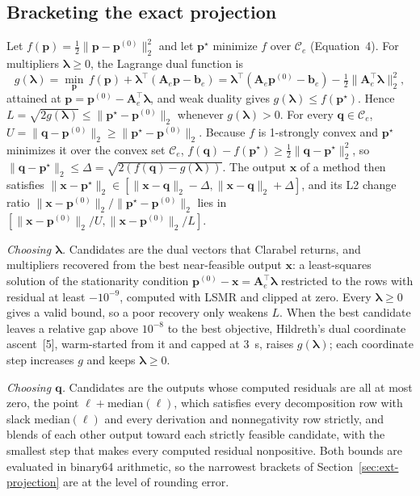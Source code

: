 \documentclass[10pt]{article}
\newcommand{\pvec}{\mathbf{p}}
\newcommand{\qvec}{\mathbf{q}}
\newcommand{\xvec}{\mathbf{x}}
\newcommand{\Amat}{\mathbf{A}}
\newcommand{\bvec}{\mathbf{b}}
\newcommand{\lam}{\boldsymbol{\lambda}}
\begin{document}
\subsection{Bracketing the exact projection}
\label{sec:bracket}
Let $f(\pvec) = \frac{1}{2}\lVert\pvec - \pvec^{(0)}\rVert_2^2$ and let $\pvec^{\star}$ minimize $f$ over $\mathcal{C}_e$ (Equation~4). For multipliers $\lam \ge 0$, the Lagrange dual function is
\begin{equation*}
g(\lam) = \min_{\pvec}\, f(\pvec) + \lam^{\top}(\Amat_e\pvec - \bvec_e) = \lam^{\top}(\Amat_e\pvec^{(0)} - \bvec_e) - \tfrac{1}{2}\lVert\Amat_e^{\top}\lam\rVert_2^2 ,
\end{equation*}
attained at $\pvec = \pvec^{(0)} - \Amat_e^{\top}\lam$, and weak duality gives $g(\lam) \le f(\pvec^{\star})$. Hence $L = \sqrt{2 g(\lam)} \le \lVert\pvec^{\star} - \pvec^{(0)}\rVert_2$ whenever $g(\lam) > 0$. For every $\qvec \in \mathcal{C}_e$, $U = \lVert\qvec - \pvec^{(0)}\rVert_2 \ge \lVert\pvec^{\star} - \pvec^{(0)}\rVert_2$. Because $f$ is 1-strongly convex and $\pvec^{\star}$ minimizes it over the convex set $\mathcal{C}_e$, $f(\qvec) - f(\pvec^{\star}) \ge \frac{1}{2}\lVert\qvec - \pvec^{\star}\rVert_2^2$, so $\lVert\qvec - \pvec^{\star}\rVert_2 \le \Delta = \sqrt{2(f(\qvec) - g(\lam))}$. The output $\xvec$ of a method then satisfies $\lVert\xvec - \pvec^{\star}\rVert_2 \in [\lVert\xvec - \qvec\rVert_2 - \Delta, \lVert\xvec - \qvec\rVert_2 + \Delta]$, and its L2 change ratio $\lVert\xvec - \pvec^{(0)}\rVert_2 / \lVert\pvec^{\star} - \pvec^{(0)}\rVert_2$ lies in $[\lVert\xvec - \pvec^{(0)}\rVert_2 / U, \lVert\xvec - \pvec^{(0)}\rVert_2 / L]$.

\emph{Choosing $\lam$.} Candidates are the dual vectors that Clarabel returns, and multipliers recovered from the best near-feasible output $\xvec$: a least-squares solution of the stationarity condition $\pvec^{(0)} - \xvec = \Amat_e^{\top}\lam$ restricted to the rows with residual at least $-10^{-9}$, computed with LSMR and clipped at zero. Every $\lam \ge 0$ gives a valid bound, so a poor recovery only weakens $L$. When the best candidate leaves a relative gap above $10^{-8}$ to the best objective, Hildreth's dual coordinate ascent~[5], warm-started from it and capped at 3~s, raises $g(\lam)$; each coordinate step increases $g$ and keeps $\lam \ge 0$.

\emph{Choosing $\qvec$.} Candidates are the outputs whose computed residuals are all at most zero, the point $\ell + \mathrm{median}(\ell)$, which satisfies every decomposition row with slack $\mathrm{median}(\ell)$ and every derivation and nonnegativity row strictly, and blends of each other output toward each strictly feasible candidate, with the smallest step that makes every computed residual nonpositive. Both bounds are evaluated in binary64 arithmetic, so the narrowest brackets of Section~\ref{sec:ext-projection} are at the level of rounding error.
\end{document}
